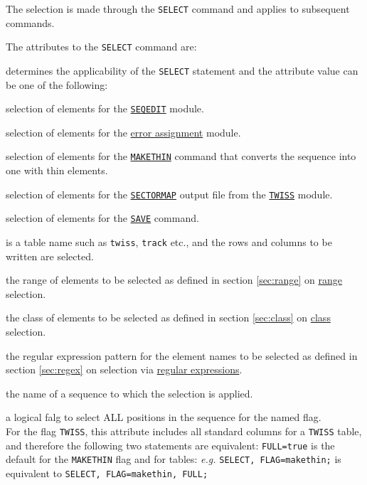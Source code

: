 The selection is made through the \texttt{SELECT} command and applies to
subsequent commands.


The attributes to the \texttt{SELECT} command are:
\begin{madlist}
   determines the applicability of the \texttt{SELECT}
  statement and the attribute value can be one of the following: 
  \begin{madlist}
     selection of elements for the
    \hyperref[sec:seqedit]{\texttt{SEQEDIT}} module.
    
     selection of elements for the
    \hyperref[chap:error]{error assignment} module.
    
     selection of elements for the
    \hyperref[chap:makethin]{\texttt{MAKETHIN}} command that
    converts the sequence into one with thin elements.
    
     selection of elements for the
    \hyperref[sec:sectormap]{\texttt{SECTORMAP}} output file
    from the \hyperref[chap:twiss]{\texttt{TWISS}} module.
    
     selection of elements for the
    \hyperref[sec:save]{\texttt{SAVE}} command.
    
     is a table name such as \texttt{twiss}, 
    \texttt{track} etc., and the rows and columns to be written are
    selected.
  \end{madlist} 
  
   the range of elements to be selected as defined in
  section \ref{sec:range} on \hyperref[sec:range]{range} selection.

   the class of elements to be selected as defined in
  section \ref{sec:class} on \hyperref[sec:class]{class} selection.

   the regular expression pattern for the element names
  to be selected as defined in section \ref{sec:regex} on selection via
  \hyperref[sec:regex]{regular expressions}. 

   the name of a sequence to which the selection is applied.

   a logical falg to select ALL positions in the sequence
  for the named flag. \\
  For the flag \texttt{TWISS}, this attribute includes all standard
  columns for a \texttt{TWISS} table, and therefore the following two
  statements are equivalent:
  \texttt{FULL=true} is the default for the \texttt{MAKETHIN} flag and
  for tables: \textsl{e.g.} \texttt{SELECT, FLAG=makethin;} is
  equivalent to \texttt{SELECT, FLAG=makethin, FULL;}   
  

\end{madlist}
